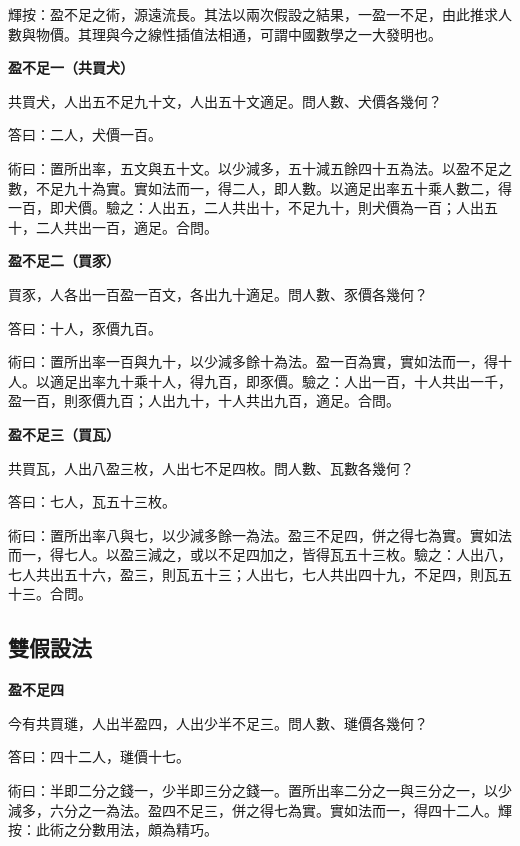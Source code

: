 \documentclass[11pt,a4paper]{article}
\newenvironment{problemenv}[1]{%
  \medskip\noindent\textbf{#1}\par\nopagebreak\smallskip
}{\medskip}
\begin{document}
輝按：盈不足之術，源遠流長。其法以兩次假設之結果，一盈一不足，由此推求人數與物價。其理與今之線性插值法相通，可謂中國數學之一大發明也。

\begin{problemenv}{盈不足一（共買犬）}
共買犬，人出五不足九十文，人出五十文適足。問人數、犬價各幾何？

\textsf{答曰：}二人，犬價一百。

\textsf{術曰：}置所出率，五文與五十文。以少減多，五十減五餘四十五為法。以盈不足之數，不足九十為實。實如法而一，得二人，即人數。以適足出率五十乘人數二，得一百，即犬價。驗之：人出五，二人共出十，不足九十，則犬價為一百；人出五十，二人共出一百，適足。合問。
\end{problemenv}

\begin{problemenv}{盈不足二（買豕）}
買豕，人各出一百盈一百文，各出九十適足。問人數、豕價各幾何？

\textsf{答曰：}十人，豕價九百。

\textsf{術曰：}置所出率一百與九十，以少減多餘十為法。盈一百為實，實如法而一，得十人。以適足出率九十乘十人，得九百，即豕價。驗之：人出一百，十人共出一千，盈一百，則豕價九百；人出九十，十人共出九百，適足。合問。
\end{problemenv}

\begin{problemenv}{盈不足三（買瓦）}
共買瓦，人出八盈三枚，人出七不足四枚。問人數、瓦數各幾何？

\textsf{答曰：}七人，瓦五十三枚。

\textsf{術曰：}置所出率八與七，以少減多餘一為法。盈三不足四，併之得七為實。實如法而一，得七人。以盈三減之，或以不足四加之，皆得瓦五十三枚。驗之：人出八，七人共出五十六，盈三，則瓦五十三；人出七，七人共出四十九，不足四，則瓦五十三。合問。
\end{problemenv}

\subsection{雙假設法}

\begin{problemenv}{盈不足四}
今有共買璡，人出半盈四，人出少半不足三。問人數、璡價各幾何？

\textsf{答曰：}四十二人，璡價十七。

\textsf{術曰：}半即二分之錢一，少半即三分之錢一。置所出率二分之一與三分之一，以少減多，六分之一為法。盈四不足三，併之得七為實。實如法而一，得四十二人。輝按：此術之分數用法，頗為精巧。
\end{problemenv}
\end{document}
